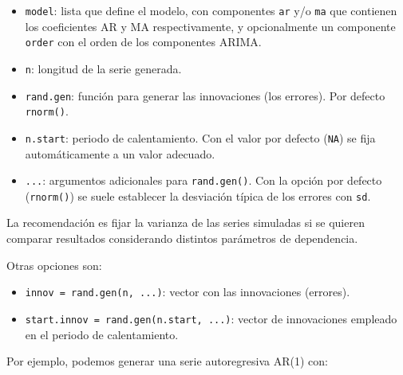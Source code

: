 \documentclass[
]{book}
\theoremstyle{break}
\theoremstyle{nonumberplain}
\begin{document}
\begin{itemize}
\item
  \texttt{model}: lista que define el modelo, con componentes \texttt{ar} y/o \texttt{ma} que
  contienen los coeficientes AR y MA respectivamente, y opcionalmente un
  componente \texttt{order} con el orden de los componentes ARIMA.
\item
  \texttt{n}: longitud de la serie generada.
\item
  \texttt{rand.gen}: función para generar las innovaciones (los errores). Por defecto
  \texttt{rnorm()}.
\item
  \texttt{n.start}: periodo de calentamiento. Con el valor por defecto (\texttt{NA}) se
  fija automáticamente a un valor adecuado.
\item
  \texttt{...}: argumentos adicionales para \texttt{rand.gen()}. Con la opción por defecto
  (\texttt{rnorm()}) se suele establecer la desviación típica de los errores con \texttt{sd}.
\end{itemize}

La recomendación es fijar la varianza de las series simuladas si se quieren
comparar resultados considerando distintos parámetros de dependencia.

Otras opciones son:

\begin{itemize}
\item
  \texttt{innov\ =\ rand.gen(n,\ ...)}: vector con las innovaciones (errores).
\item
  \texttt{start.innov\ =\ rand.gen(n.start,\ ...)}: vector de innovaciones empleado en
  el periodo de calentamiento.
\end{itemize}

Por ejemplo, podemos generar una serie autoregresiva AR(1) con:
\end{document}
